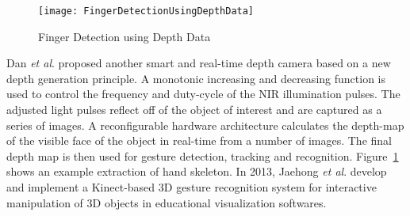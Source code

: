 %
\begin{figure}[b]
\centering
\texttt{[image: FingerDetectionUsingDepthData]}
\caption{Finger Detection using Depth Data \cite{NIRGesture14}}
\label{FingerDetectionUsingDepthData}
\end{figure}%
Dan \textit{et al}. \cite{NIRGesture14} proposed another smart and real-time depth camera based on a new depth generation principle. A monotonic increasing and decreasing function is used to control the frequency and duty-cycle of the NIR illumination pulses. The adjusted light pulses reflect off of the object of interest and are captured as a series of images. A reconfigurable hardware architecture calculates the depth-map of the visible face of the object in real-time from a number of images. The final depth map is then used for gesture detection, tracking and recognition. Figure~\ref{FingerDetectionUsingDepthData} shows an example extraction of hand skeleton. In 2013, Jaehong \textit{et al}. \cite{InteractiveManipulation_2013} develop and implement a Kinect-based 3D gesture recognition system for interactive
manipulation of 3D objects in educational visualization softwares. 
\\\indent%
%
